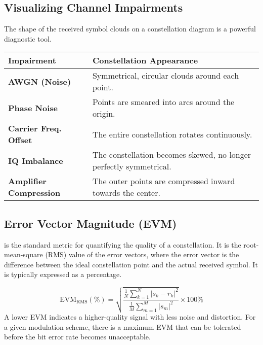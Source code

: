 \subsection{Visualizing Channel Impairments}

The shape of the received symbol clouds on a constellation diagram is a powerful diagnostic tool.

\begin{center}
    \begin{tabular}{@{}ll@{}}
        \toprule
        \tableheaderfont Impairment & \tableheaderfont Constellation Appearance \\
        \midrule
        \textbf{AWGN (Noise)} & Symmetrical, circular clouds around each point. \\
        \textbf{Phase Noise} & Points are smeared into arcs around the origin. \\
        \textbf{Carrier Freq. Offset} & The entire constellation rotates continuously. \\
        \textbf{IQ Imbalance} & The constellation becomes skewed, no longer perfectly symmetrical. \\
        \textbf{Amplifier Compression} & The outer points are compressed inward towards the center. \\
        \bottomrule
    \end{tabular}
\end{center}


\subsection{Error Vector Magnitude (EVM)}

 is the standard metric for quantifying the quality of a constellation. It is the root-mean-square (RMS) value of the error vectors, where the error vector is the difference between the ideal constellation point and the actual received symbol. It is typically expressed as a percentage.

\begin{equation}
    \text{EVM}_{\text{RMS}} (\%) = \sqrt{\frac{\frac{1}{N}\sum_{k=1}^{N}|s_k - r_k|^2}{\frac{1}{M}\sum_{m=1}^{M}|s_m|^2}} \times 100\%
\end{equation}
A lower EVM indicates a higher-quality signal with less noise and distortion. For a given modulation scheme, there is a maximum EVM that can be tolerated before the bit error rate becomes unacceptable.

